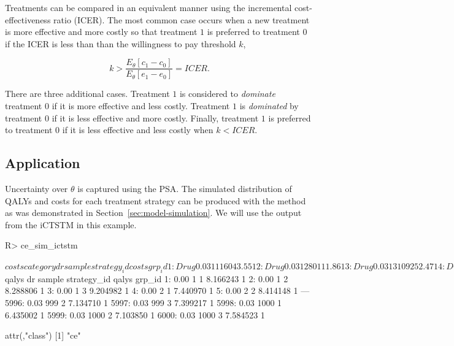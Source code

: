 \documentclass[article, nojss]{jss}\usepackage[]{graphicx}\usepackage[]{color}
\begin{document}
Treatments can be compared in an equivalent manner using the incremental cost-effectiveness ratio (ICER). The most common case occurs when a new treatment is more effective and more costly so that treatment $1$ is preferred to treatment $0$ if the ICER is less than than the willingness to pay threshold $k$,

\begin{equation}
k > \frac{E_\theta[c_{1} - c_{0}]}{E_\theta[e_{1} - e_{0}]} = ICER.
\end{equation}

There are three additional cases. Treatment $1$ is considered to \emph{dominate} treatment $0$ if it is more effective and less costly. Treatment $1$ is \emph{dominated} by treatment $0$ if it is less effective and more costly. Finally, treatment $1$ is preferred to treatment $0$ if it is less effective and less costly when $k < ICER$. 

\subsection{Application}
Uncertainty over $\theta$ is captured using the PSA. The simulated distribution of QALYs and costs for each treatment strategy can be produced with the  method as was demonstrated in Section~\ref{sec:model-simulation}. We will use the output from the iCTSTM in this example. 

\begin{Schunk}
\begin{Sinput}
R> ce_sim_ictstm
\end{Sinput}
\begin{Soutput}
$costs
      category   dr sample strategy_id     costs grp_id
   1:     Drug 0.03      1           1  16043.55      1
   2:     Drug 0.03      1           2  80111.86      1
   3:     Drug 0.03      1           3 109252.47      1
   4:     Drug 0.03      2           1  14645.16      1
   5:     Drug 0.03      2           2  77962.49      1
  ---                                                  
8996:    total 0.03    999           2  95024.16      1
8997:    total 0.03    999           3 122357.69      1
8998:    total 0.03   1000           1  52638.13      1
8999:    total 0.03   1000           2 119410.47      1
9000:    total 0.03   1000           3 151164.45      1

$qalys
        dr sample strategy_id    qalys grp_id
   1: 0.00      1           1 8.166243      1
   2: 0.00      1           2 8.288806      1
   3: 0.00      1           3 9.204982      1
   4: 0.00      2           1 7.440970      1
   5: 0.00      2           2 8.414148      1
  ---                                        
5996: 0.03    999           2 7.134710      1
5997: 0.03    999           3 7.399217      1
5998: 0.03   1000           1 6.435002      1
5999: 0.03   1000           2 7.103850      1
6000: 0.03   1000           3 7.584523      1

attr(,"class")
[1] "ce"
\end{Soutput}
\end{Schunk}
\end{document}
